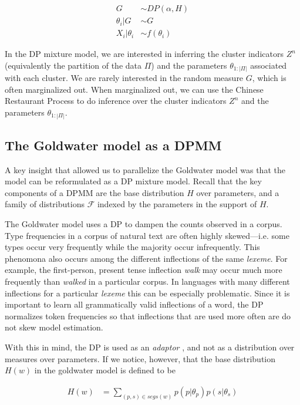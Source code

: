 \begin{align}
  G &\sim DP(\alpha, H) \\ \theta_i|G &\sim G \\ X_i|\theta_i &\sim f(\theta_i)
\end{align}

In the DP mixture model, we are interested in inferring the cluster
indicators $Z^n$ (equivalently the partition of the data $\Pi$) and
the parameters $\theta_{1:|\Pi|}$ associated with each cluster. We are
rarely interested in the random measure $G$, which is often
marginalized out. When marginalized out, we can use the Chinese
Restaurant Process to do inference over the cluster indicators $Z^n$
and the parameters $\theta_{1:|\Pi|}$.

\subsection{The Goldwater model as a DPMM}

A key insight that allowed us to parallelize the Goldwater model was
that the model can be reformulated as a DP mixture model. Recall that
the key components of a DPMM are the base distribution $H$ over
parameters, and a family of distributions $\mathcal{F}$ indexed by the
parameters in the support of $H$.

The Goldwater model uses a DP to dampen the counts observed in a
corpus. Type frequencies in a corpus of natural text are often highly
skewed---i.e. some types occur very frequently while the majority
occur infrequently. This phenomona also occurs among the different
inflections of the same \textit{lexeme}. For example, the
first-person, present tense inflection \textit{walk} may occur much
more frequently than \textit{walked} in a particular corpus. In
languages with many different inflections for a particular
\textit{lexeme} this can be especially problematic. Since it is
important to learn all grammatically valid inflections of a word, the
DP normalizes token frequencies so that inflections that are used more
often are do not skew model estimation.

With this in mind, the DP is used as an \textit{adaptor}
\cite{goldwater2011}, and not as a distribution over measures over
parameters. If we notice, however, that the base distribution $H(w)$
in the goldwater model is defined to be

\begin{align*}
  H(w) &= \sum_{(p,s) \in segs(w)} p(p | \theta_p) p(s | \theta_s)
\end{align*}

